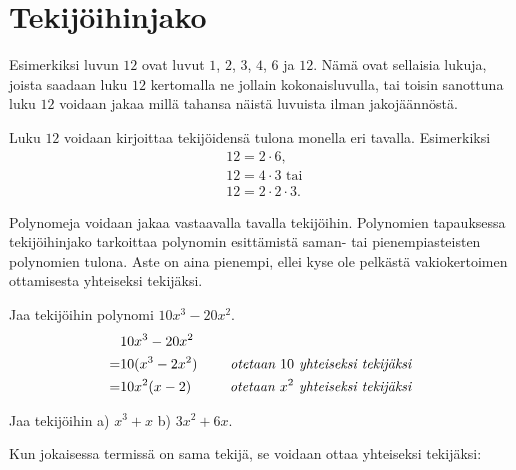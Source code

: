 \section{Tekijöihinjako}



Esimerkiksi luvun $12$  ovat luvut $1$, $2$, $3$, $4$, $6$ ja $12$. Nämä ovat sellaisia
lukuja, joista saadaan luku $12$ kertomalla ne jollain kokonaisluvulla, tai toisin sanottuna luku $12$ voidaan jakaa
millä tahansa näistä luvuista ilman jakojäännöstä.

\begin{esimerkki}
Luku $12$ voidaan kirjoittaa tekijöidensä tulona monella eri tavalla. Esimerkiksi
\begin{align*}
&12 = 2 \cdot 6, \\
&12= 4 \cdot 3 \text{ tai } \\
&12= 2 \cdot 2 \cdot 3.
\end{align*}
\end{esimerkki}

Polynomeja voidaan jakaa vastaavalla tavalla tekijöihin. Polynomien tapauksessa tekijöihinjako tarkoittaa
polynomin esittämistä saman- tai pienempiasteisten polynomien tulona. Aste on aina pienempi, ellei kyse ole pelkästä
vakiokertoimen ottamisesta yhteiseksi tekijäksi.

\begin{esimerkki}
Jaa tekijöihin polynomi $10x^3-20x^2$.
\begin{align*}
& 10x^3-20x^2 \\
=& 10(x^3-2x^2) \ \ \ \ &\emph{otetaan $10$ yhteiseksi tekijäksi} \\
=& 10x^2(x-2) &\emph{otetaan $x^2$ yhteiseksi tekijäksi} \\
\end{align*}
\end{esimerkki}

\begin{esimerkki}
Jaa tekijöihin \quad a) $x^3+x$ \quad b) $3x^2+6x.$

Kun jokaisessa termissä on sama tekijä, se voidaan ottaa yhteiseksi tekijäksi:
\begin{alakohdat}
\end{alakohdat}
\end{esimerkki}

